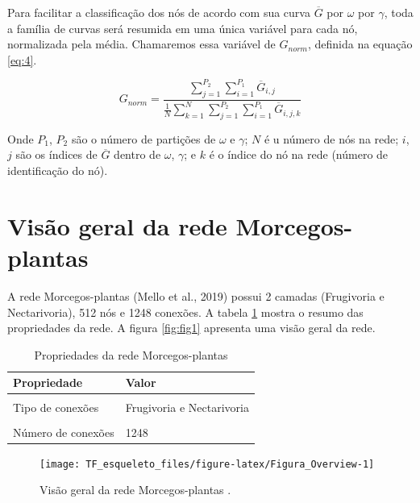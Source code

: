 \documentclass[
  12pt,
]{article}
\begin{document}
Para facilitar a classificação dos nós de acordo com sua curva
\(\overline{G}\) por \(\omega\) por \(\gamma\), toda a família de curvas
será resumida em uma única variável para cada nó, normalizada pela
média. Chamaremos essa variável de \(G_{norm}\), definida na equação
\ref{eq:4}.

\begin{equation} \label{eq:4}
    G_{norm} = \frac{\sum_{j=1}^{P_2} \sum_{i = 1}^{P_1} \overline{G}_{i,j}}{\frac{1}{N} \sum_{k=1}^{N} \sum_{j=1}^{P_2} \sum_{i = 1}^{P_1} \overline{G}_{i,j,k}}
\end{equation}

Onde \(P_1\), \(P_2\) são o número de partições de \(\omega\) e
\(\gamma\); \(N\) é u número de nós na rede; \(i\), \(j\) são os índices
de \(\overline{G}\) dentro de \(\omega\), \(\gamma\); e \(k\) é o índice
do nó na rede (número de identificação do nó).

\pagebreak

\hypertarget{visuxe3o-geral-da-rede-morcegos-plantas}{%
\section{Visão geral da rede
Morcegos-plantas}\label{visuxe3o-geral-da-rede-morcegos-plantas}}

A rede Morcegos-plantas (Mello et al., 2019) possui 2 camadas
(Frugivoria e Nectarivoria), 512 nós e 1248 conexões. A tabela
\ref{tab:1} mostra o resumo das propriedades da rede. A figura
\ref{fig:fig1} apresenta uma visão geral da rede.

\begin{table}[!h]

\caption{\label{tab:Tabela_Prop_Rede}\label{tab:1}Propriedades da rede  Morcegos-plantas}
\centering
\begin{tabular}[t]{ll}
\toprule
Propriedade & Valor\\
\midrule
\cellcolor{gray!6}{Número de Camadas} & \cellcolor{gray!6}{2}\\
Tipo de conexões & Frugivoria  e  Nectarivoria\\
\cellcolor{gray!6}{Número de nós} & \cellcolor{gray!6}{512}\\
Número de conexões & 1248\\
\bottomrule
\end{tabular}
\end{table}

\begin{figure}[H]

{\centering \texttt{[image: TF\_esqueleto\_files/figure-latex/Figura\_Overview-1]} 

}

\caption{\label{fig:fig1}Visão geral da rede  Morcegos-plantas .}\label{fig:Figura_Overview}
\end{figure}
\end{document}
